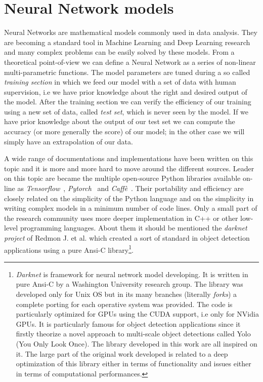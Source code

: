 \documentclass{standalone}
\begin{document}
\section[Neural Network models]{Neural Network models}\label{nn}

Neural Networks are mathematical models commonly used in data analysis.
They are becoming a standard tool in Machine Learning and Deep Learning research and many complex problems can be easily solved by these models.
From a theoretical point-of-view we can define a Neural Network as a series of non-linear multi-parametric functions.
The model parameters are tuned during a so called \emph{training section} in which we feed our model with a set of data with human supervision, i.e we have prior knowledge about the right and desired output of the model.
After the training section we can verify the efficiency of our training using a new set of data, called \emph{test set}, which is never seen by the model.
If we have prior knowledge about the output of our test set we can compute the accuracy (or more generally the score) of our model; in the other case we will simply have an extrapolation of our data.

A wide range of documentations and implementations have been written on this topic and it is more and more hard to move around the different sources.
Leader on this topic are became the multiple open-source Python libraries available on-line as \emph{Tensorflow}~\cite{tensorflow2015-whitepaper}, \emph{Pytorch}~\cite{paszke2017automatic} and \emph{Caffè}~\cite{Jia:2014:Caffe}.
Their portability and efficiency are closely related on the simplicity of the Python language and on the simplicity in writing complex models in a minimum number of code lines.
Only a small part of the research community uses more deeper implementation in C++ or other low-level programming languages.
About them it should be mentioned the \emph{darknet project} of Redmon J. et al. which created a sort of standard in object detection applications using a pure Ansi-C library\footnote{
  \emph{Darknet} is framework for neural network model developing.
  It is written in pure Ansi-C by a Washington University research group.
  The library was developed only for Unix OS but in its many branches (literally \emph{forks}) a complete porting for each operative system was provided.
  The code is particularly optimized for GPUs using the CUDA support, i.e only for NVidia GPUs.
  It is particularly famous for object detection applications since it firstly theorize a novel approach to multi-scale object detections called Yolo (You Only Look Once).
  The library developed in this work are all inspired on it.
  The large part of the original work developed is related to a deep optimization of this library either in terms of functionality and issues either in terms of computational performances.
}.
\end{document}
